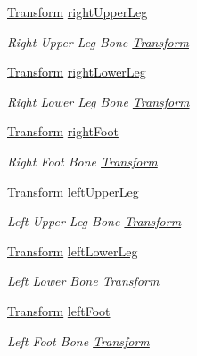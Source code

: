 \begin{DoxyCompactItemize}
\mbox{\hyperlink{class_lua_1_1_transform}{Transform}} \mbox{\hyperlink{class_lua_1_1_bones_a2192099d2fee781ee13c3591caa8c78c}{right\+Upper\+Leg}}
\begin{DoxyCompactList}\small\item\em Right Upper Leg Bone \mbox{\hyperlink{class_lua_1_1_transform}{Transform}} \end{DoxyCompactList}\item 
\mbox{\hyperlink{class_lua_1_1_transform}{Transform}} \mbox{\hyperlink{class_lua_1_1_bones_a7322bb4e06909a72de8cb7899bbdda28}{right\+Lower\+Leg}}
\begin{DoxyCompactList}\small\item\em Right Lower Leg Bone \mbox{\hyperlink{class_lua_1_1_transform}{Transform}} \end{DoxyCompactList}\item 
\mbox{\hyperlink{class_lua_1_1_transform}{Transform}} \mbox{\hyperlink{class_lua_1_1_bones_ae0707d3e06ec285d2d4634b26b046bbe}{right\+Foot}}
\begin{DoxyCompactList}\small\item\em Right Foot Bone \mbox{\hyperlink{class_lua_1_1_transform}{Transform}} \end{DoxyCompactList}\item 
\mbox{\hyperlink{class_lua_1_1_transform}{Transform}} \mbox{\hyperlink{class_lua_1_1_bones_a260c8638158d2f0580c1275351f4a1f2}{left\+Upper\+Leg}}
\begin{DoxyCompactList}\small\item\em Left Upper Leg Bone \mbox{\hyperlink{class_lua_1_1_transform}{Transform}} \end{DoxyCompactList}\item 
\mbox{\hyperlink{class_lua_1_1_transform}{Transform}} \mbox{\hyperlink{class_lua_1_1_bones_acade1832236cb1887d8d4e30af54fbef}{left\+Lower\+Leg}}
\begin{DoxyCompactList}\small\item\em Left Lower Bone \mbox{\hyperlink{class_lua_1_1_transform}{Transform}} \end{DoxyCompactList}\item 
\mbox{\hyperlink{class_lua_1_1_transform}{Transform}} \mbox{\hyperlink{class_lua_1_1_bones_a6ee2d4c0e55ea06ca64e086680d87331}{left\+Foot}}
\begin{DoxyCompactList}\small\item\em Left Foot Bone \mbox{\hyperlink{class_lua_1_1_transform}{Transform}} \end{DoxyCompactList}\end{DoxyCompactItemize}


